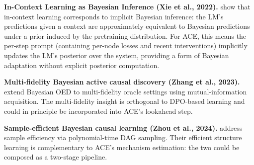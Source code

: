 \textbf{In-Context Learning as Bayesian Inference (Xie et al., 2022).} \citet{xie2022explanation} show that in-context learning corresponds to implicit Bayesian inference: the LM's predictions given a context are approximately equivalent to Bayesian predictions under a prior induced by the pretraining distribution. For ACE, this means the per-step prompt (containing per-node losses and recent interventions) implicitly updates the LM's posterior over the system, providing a form of Bayesian adaptation without explicit posterior computation.

\textbf{Multi-fidelity Bayesian active causal discovery (Zhang et al., 2023).} \citet{zhang2023bayesian} extend Bayesian OED to multi-fidelity oracle settings using mutual-information acquisition. The multi-fidelity insight is orthogonal to DPO-based learning and could in principle be incorporated into ACE's lookahead step.

\textbf{Sample-efficient Bayesian causal learning (Zhou et al., 2024).} \citet{zhou2024sample} address sample efficiency via polynomial-time DAG sampling. Their efficient structure learning is complementary to ACE's mechanism estimation: the two could be composed as a two-stage pipeline.
